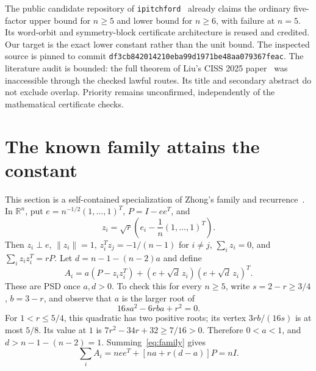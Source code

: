 \documentclass[11pt]{article}
\newcommand{\R}{\mathbb R}
\begin{document}
The public candidate repository of \texttt{ipitchford}~\cite{pitchford}
already claims the ordinary five-factor upper bound for $n\ge5$ and lower
bound for $n\ge6$, with failure at $n=5$. Its word-orbit and symmetry-block
certificate architecture is reused and credited. Our target is the exact
lower constant rather than the unit bound. The inspected source is pinned
to commit \texttt{df3cb842014210eba99d1971be48aa079367feac}.
The literature audit is bounded: the full theorem of Liu's CISS 2025
paper~\cite{liu} was inaccessible through the checked lawful routes.
Its title and secondary abstract do not exclude overlap. Priority remains
unconfirmed, independently of the mathematical certificate checks.

\section{The known family attains the constant}\label{sec:attainment}
This section is a self-contained specialization of Zhong's family and
recurrence~\cite[Section~1.1 and Appendix~A]{zhong}.
In $\R^n$, put $e=n^{-1/2}(1,\ldots,1)^T$, $P=I-ee^T$, and
\[
 z_i=\sqrt r\left(e_i-\frac1n(1,\ldots,1)^T\right).
\]
Then $z_i\perp e$, $\|z_i\|=1$, $z_i^Tz_j=-1/(n-1)$ for $i\ne j$,
$\sum_i z_i=0$, and $\sum_i z_i z_i^T=rP$.
Let $d=n-1-(n-2)a$ and define
\begin{equation}\label{eq:family}
 A_i=a(P-z_i z_i^T)+(e+\sqrt d\,z_i)(e+\sqrt d\,z_i)^T.
\end{equation}
These are PSD once $a,d>0$. To check this for every $n\ge5$, write
$s=2-r\ge3/4$, $b=3-r$, and observe that $a$ is the larger root of
\begin{equation}\label{eq:stationarity}
 16s a^2-6rb a+r^2=0.
\end{equation}
For $1<r\le5/4$, this quadratic has two positive roots; its vertex
$3rb/(16s)$ is at most $5/8$. Its value at $1$ is
$7r^2-34r+32\ge7/16>0$. Therefore $0<a<1$, and
$d>n-1-(n-2)=1$. Summing~\eqref{eq:family} gives
\[
 \sum_i A_i=n ee^T+[na+r(d-a)]P=nI.
\]
\end{document}
